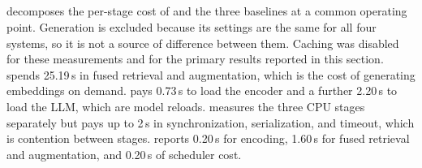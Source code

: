 \subsection{\texorpdfstring{}{Stage-Level Latency Breakdown}}
\label{sec:breakdown}

\begin{newtext}
 decomposes the per-stage cost of \design{} and the three baselines at a common operating point. Generation is excluded because its settings are the same for all four systems, so it is not a source of difference between them. Caching was disabled for these measurements and for the primary results reported in this section. \edgeRAG{} spends 25.19\,s in fused retrieval and augmentation, which is the cost of generating embeddings on demand. \flashRAG{} pays 0.73\,s to load the encoder and a further 2.20\,s to load the LLM, which are model reloads. \pipeRAG{} measures the three CPU stages separately but pays up to 2\,s in synchronization, serialization, and timeout, which is contention between stages. \design{} reports 0.20\,s for encoding, 1.60\,s for fused retrieval and augmentation, and 0.20\,s of scheduler cost.
\end{newtext}

